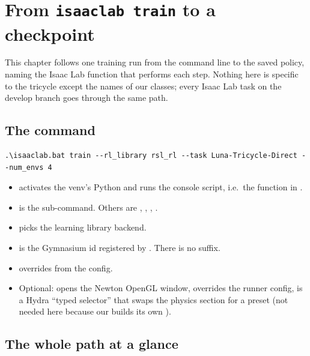 \chapter{From \texttt{isaaclab train} to a checkpoint}
\label{ch:pipeline}

This chapter follows one training run from the command line to the saved
policy, naming the Isaac Lab function that performs each step. Nothing here is
specific to the tricycle except the names of our classes; every Isaac Lab
task on the develop branch goes through the same path.

\section{The command}

\begin{lstlisting}[style=shell]
.\isaaclab.bat train --rl_library rsl_rl --task Luna-Tricycle-Direct --num_envs 4
\end{lstlisting}

\begin{itemize}[leftmargin=1.6em]
  \item {} activates the venv's Python and runs the
         console script, i.e.\ the function  in
        .
  \item {} is the sub-command. Others are ,
        , , .
  \item {} picks the learning library backend.
  \item {} is the Gymnasium id registered by
        . There is no  suffix.
  \item {} overrides  from the config.
  \item Optional:  opens the Newton OpenGL window,
         overrides the runner config,
         is a Hydra ``typed selector'' that swaps
        the physics section for a preset (not needed here because our
         builds its own ).
\end{itemize}

\section{The whole path at a glance}


